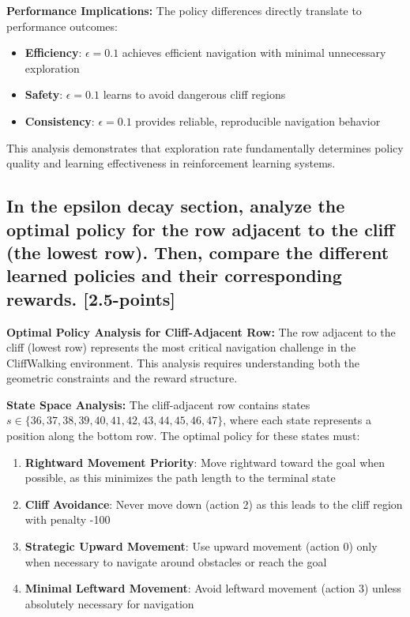 \documentclass[12pt]{article}
\begin{document}
{{{\textbf{Performance Implications:}
The policy differences directly translate to performance outcomes:
\begin{itemize}
    \item \textbf{Efficiency}: $\epsilon = 0.1$ achieves efficient navigation with minimal unnecessary exploration
    \item \textbf{Safety}: $\epsilon = 0.1$ learns to avoid dangerous cliff regions
    \item \textbf{Consistency}: $\epsilon = 0.1$ provides reliable, reproducible navigation behavior
\end{itemize}

This analysis demonstrates that exploration rate fundamentally determines policy quality and learning effectiveness in reinforcement learning systems.

\subsection{In the epsilon decay section, analyze the optimal policy for the row adjacent to the cliff (the lowest row). Then, compare the different learned policies and their corresponding rewards. [2.5-points]}

\textbf{Optimal Policy Analysis for Cliff-Adjacent Row:}
The row adjacent to the cliff (lowest row) represents the most critical navigation challenge in the CliffWalking environment. This analysis requires understanding both the geometric constraints and the reward structure.

\textbf{State Space Analysis:}
The cliff-adjacent row contains states $s \in \{36, 37, 38, 39, 40, 41, 42, 43, 44, 45, 46, 47\}$, where each state represents a position along the bottom row. The optimal policy for these states must:

\begin{enumerate}
    \item \textbf{Rightward Movement Priority}: Move rightward toward the goal when possible, as this minimizes the path length to the terminal state
    \item \textbf{Cliff Avoidance}: Never move down (action 2) as this leads to the cliff region with penalty -100
    \item \textbf{Strategic Upward Movement}: Use upward movement (action 0) only when necessary to navigate around obstacles or reach the goal
    \item \textbf{Minimal Leftward Movement}: Avoid leftward movement (action 3) unless absolutely necessary for navigation
\end{enumerate}

}}}
\end{document}
